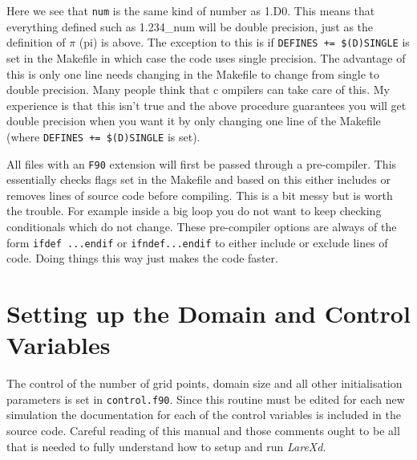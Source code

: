 \documentclass[11pt]{article}
\begin{document}
Here we see that \texttt{num} is the same kind of number as 1.D0. This means that everything defined such as 1.234\_num 
will be double precision, just as the definition of $\pi$ (pi) is above. The exception to this is if 
\texttt{DEFINES += \$(D)SINGLE} is set in the Makefile in which case the code uses single precision. The advantage of 
this is only one line needs changing in the Makefile to change from single to double precision. Many people think that c
ompilers can take care of this. My experience is that this isn't true and the above procedure guarantees you will get 
double precision when you want it by only changing one line of the Makefile (where {\tt DEFINES += \$(D)SINGLE} is set).

All files with an \texttt{F90} extension will first be passed through a pre-compiler. This essentially checks flags set 
in the Makefile and based on this either includes or removes lines of source code before compiling. This is a bit messy 
but is worth the trouble. For example inside a big loop you do not want to keep checking conditionals which do not change. 
These pre-compiler options are always of the form \texttt{ifdef ...endif} or \texttt{ifndef...endif} to either include 
or exclude lines of code. Doing things this way just makes the code faster.

\section{Setting up the Domain and Control Variables}
The control of the number of grid points, domain size and all other initialisation parameters is set in \texttt{control.f90}. 
Since this routine must be edited for each new simulation the documentation for each of the control variables is 
included in the source code. Careful reading of this manual and those comments ought to be all that is needed to fully 
understand how to setup and run \textit{LareXd}.
\end{document}

